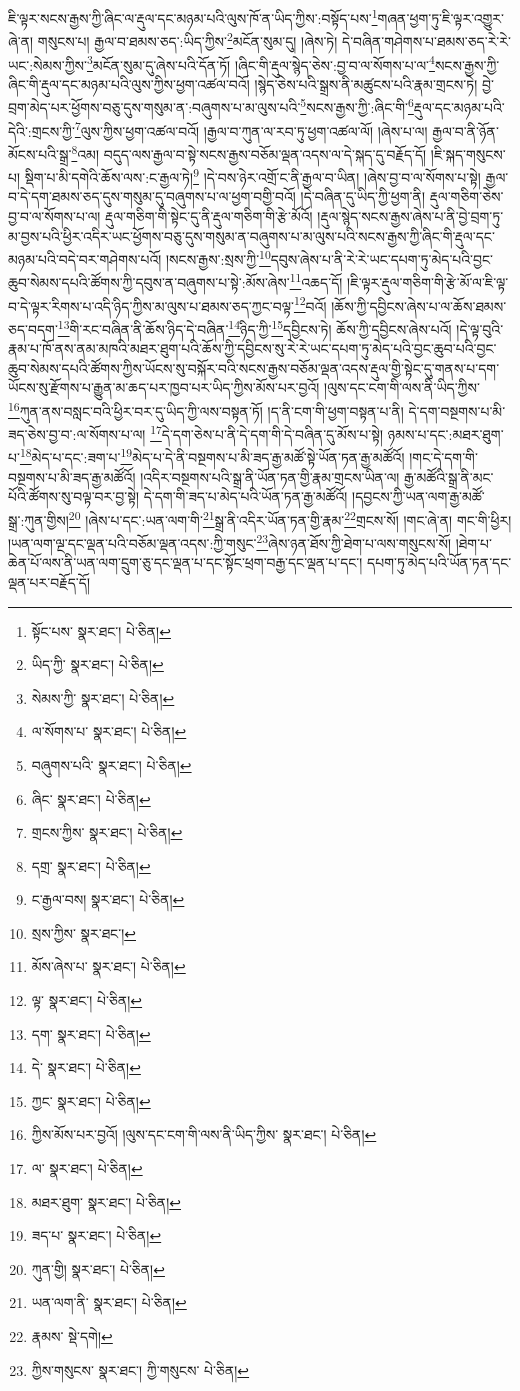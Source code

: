 ཇི་ལྟར་སངས་རྒྱས་ཀྱི་ཞིང་ལ་རྡུལ་དང་མཉམ་པའི་ལུས་ཁོ་ན་ཡིད་ཀྱིས་:བསྟོད་པས་\footnote{སྟོང་པས་  སྣར་ཐང་།  པེ་ཅིན། }གཞན་ཕྱག་ཏུ་ཇི་ལྟར་འགྱུར་ཞེ་ན། གསུངས་པ། རྒྱལ་བ་ཐམས་ཅད་:ཡིད་ཀྱིས་\footnote{ཡིད་ཀྱི་  སྣར་ཐང་།  པེ་ཅིན། }མངོན་སུམ་དུ། །ཞེས་ཏེ། དེ་བཞིན་གཤེགས་པ་ཐམས་ཅད་རེ་རེ་ཡང་:སེམས་ཀྱིས་\footnote{སེམས་ཀྱི་  སྣར་ཐང་།  པེ་ཅིན། }མངོན་སུམ་དུ་ཞེས་པའི་དོན་ཏོ། །ཞིང་གི་རྡུལ་སྙེད་ཅེས་:བྱ་བ་ལ་སོགས་པ་ལ་\footnote{ལ་སོགས་པ་  སྣར་ཐང་།  པེ་ཅིན། }སངས་རྒྱས་ཀྱི་ཞིང་གི་རྡུལ་དང་མཉམ་པའི་ལུས་ཀྱིས་ཕྱག་འཚལ་བའོ། །སྙེད་ཅེས་པའི་སྒྲས་ནི་མཚུངས་པའི་རྣམ་གྲངས་ཏེ། བྱེ་བྲག་མེད་པར་ཕྱོགས་བཅུ་དུས་གསུམ་ན་:བཞུགས་པ་མ་ལུས་པའི་\footnote{བཞུགས་པའི་  སྣར་ཐང་།  པེ་ཅིན། }སངས་རྒྱས་ཀྱི་:ཞིང་གི་\footnote{ཞིང་  སྣར་ཐང་།  པེ་ཅིན། }རྡུལ་དང་མཉམ་པའི་དེའི་:གྲངས་ཀྱི་\footnote{གྲངས་ཀྱིས་  སྣར་ཐང་།  པེ་ཅིན། }ལུས་ཀྱིས་ཕྱག་འཚལ་བའོ། །རྒྱལ་བ་ཀུན་ལ་རབ་ཏུ་ཕྱག་འཚལ་ལོ། །ཞེས་པ་ལ། རྒྱལ་བ་ནི་ཉོན་མོངས་པའི་སྒྲ་\footnote{དགྲ་  སྣར་ཐང་།  པེ་ཅིན། }འམ། བདུད་ལས་རྒྱལ་བ་སྟེ་སངས་རྒྱས་བཅོམ་ལྡན་འདས་ལ་དེ་སྐད་དུ་བརྗོད་དོ། །ཇི་སྐད་གསུངས་པ། སྡིག་པ་མི་དགེའི་ཆོས་ལས་:ང་རྒྱལ་ཏེ།\footnote{ང་རྒྱལ་བས།  སྣར་ཐང་།  པེ་ཅིན། } །དེ་བས་ཉེར་འགྲོ་ང་ནི་རྒྱལ་བ་ཡིན། །ཞེས་བྱ་བ་ལ་སོགས་པ་སྟེ། རྒྱལ་བ་དེ་དག་ཐམས་ཅད་དུས་གསུམ་དུ་བཞུགས་པ་ལ་ཕྱག་བགྱི་བའོ། །དེ་བཞིན་དུ་ཡིད་ཀྱི་ཕྱག་ནི། རྡུལ་གཅིག་ཅེས་བྱ་བ་ལ་སོགས་པ་ལ། རྡུལ་གཅིག་གི་སྟེང་དུ་ནི་རྡུལ་གཅིག་གི་རྩེ་མོའོ། །རྡུལ་སྙེད་སངས་རྒྱས་ཞེས་པ་ནི་བྱེ་བྲག་ཏུ་མ་བྱས་པའི་ཕྱིར་འདིར་ཡང་ཕྱོགས་བཅུ་དུས་གསུམ་ན་བཞུགས་པ་མ་ལུས་པའི་སངས་རྒྱས་ཀྱི་ཞིང་གི་རྡུལ་དང་མཉམ་པའི་བདེ་བར་གཤེགས་པའོ། །སངས་རྒྱས་:སྲས་ཀྱི་\footnote{སྲས་ཀྱིས་  སྣར་ཐང་། }དབུས་ཞེས་པ་ནི་རེ་རེ་ཡང་དཔག་ཏུ་མེད་པའི་བྱང་ཆུབ་སེམས་དཔའི་ཚོགས་ཀྱི་དབུས་ན་བཞུགས་པ་སྟེ་:མོས་ཞེས་\footnote{མོས་ཞེས་པ་  སྣར་ཐང་།  པེ་ཅིན། }འཆད་དོ། །ཇི་ལྟར་རྡུལ་གཅིག་གི་རྩེ་མོ་ལ་ཇི་ལྟ་བ་དེ་ལྟར་རིགས་པ་འདི་ཉིད་ཀྱིས་མ་ལུས་པ་ཐམས་ཅད་ཀྱང་བལྟ་\footnote{ལྟ་  སྣར་ཐང་།  པེ་ཅིན། }བའོ། །ཆོས་ཀྱི་དབྱིངས་ཞེས་པ་ལ་ཆོས་ཐམས་ཅད་བདག་\footnote{དག་  སྣར་ཐང་།  པེ་ཅིན། }གི་རང་བཞིན་ནི་ཆོས་ཉིད་དེ་བཞིན་\footnote{དེ་  སྣར་ཐང་།  པེ་ཅིན། }ཉིད་ཀྱི་\footnote{ཀྱང་  སྣར་ཐང་།  པེ་ཅིན། }དབྱིངས་ཏེ། ཆོས་ཀྱི་དབྱིངས་ཞེས་པའོ། །དེ་ལྟ་བུའི་རྣམ་པ་ཁོ་ནས་ནམ་མཁའི་མཐར་ཐུག་པའི་ཆོས་ཀྱི་དབྱིངས་སུ་རེ་རེ་ཡང་དཔག་ཏུ་མེད་པའི་བྱང་ཆུབ་པའི་བྱང་ཆུབ་སེམས་དཔའི་ཚོགས་ཀྱིས་ཡོངས་སུ་བསྐོར་བའི་སངས་རྒྱས་བཅོམ་ལྡན་འདས་རྡུལ་གྱི་སྟེང་དུ་གནས་པ་དག་ཡོངས་སུ་རྫོགས་པ་རྒྱུན་མ་ཆད་པར་ཁྱབ་པར་ཡིད་ཀྱིས་མོས་པར་བྱའོ། །ལུས་དང་ངག་གི་ལས་ནི་ཡིད་ཀྱིས་\footnote{ཀྱིས་མོས་པར་བྱའོ། །ལུས་དང་ངག་གི་ལས་ནི་ཡིད་ཀྱིས་  སྣར་ཐང་།  པེ་ཅིན། }ཀུན་ནས་བསླང་བའི་ཕྱིར་བར་དུ་ཡིད་ཀྱི་ལས་བསྟན་ཏོ། །ད་ནི་ངག་གི་ཕྱག་བསྟན་པ་ནི། དེ་དག་བསྔགས་པ་མི་ཟད་ཅེས་བྱ་བ་:ལ་སོགས་པ་ལ། \footnote{ལ་  སྣར་ཐང་།  པེ་ཅིན། }དེ་དག་ཅེས་པ་ནི་དེ་དག་གི་དེ་བཞིན་དུ་མོས་པ་སྟེ། ཉམས་པ་དང་:མཐར་ཐུག་པ་\footnote{མཐར་ཐུག་  སྣར་ཐང་།  པེ་ཅིན། }མེད་པ་དང་:ཟག་པ་\footnote{ཟད་པ་  སྣར་ཐང་།  པེ་ཅིན། }མེད་པ་དེ་ནི་བསྔགས་པ་མི་ཟད་རྒྱ་མཚོ་སྟེ་ཡོན་ཏན་རྒྱ་མཚོའོ། །གང་དེ་དག་གི་བསྔགས་པ་མི་ཟད་རྒྱ་མཚོའོ། །འདིར་བསྔགས་པའི་སྒྲ་ནི་ཡོན་ཏན་གྱི་རྣམ་གྲངས་ཡིན་ལ། རྒྱ་མཚོའི་སྒྲ་ནི་མང་པོའི་ཚོགས་སུ་བལྟ་བར་བྱ་སྟེ། དེ་དག་གི་ཟད་པ་མེད་པའི་ཡོན་ཏན་རྒྱ་མཚོའོ། །དབྱངས་ཀྱི་ཡན་ལག་རྒྱ་མཚོ་སྒྲ་:ཀུན་གྱིས།\footnote{ཀུན་གྱི།  སྣར་ཐང་།  པེ་ཅིན། } །ཞེས་པ་དང་:ཡན་ལག་གི་\footnote{ཡན་ལག་ནི་  སྣར་ཐང་།  པེ་ཅིན། }སྒྲ་ནི་འདིར་ཡོན་ཏན་གྱི་རྣམ་\footnote{རྣམས་  སྡེ་དགེ། }གྲངས་སོ། །གང་ཞེ་ན། གང་གི་ཕྱིར། །ཡན་ལག་ལྔ་དང་ལྡན་པའི་བཅོམ་ལྡན་འདས་:ཀྱི་གསུང་\footnote{ཀྱིས་གསུངས་  སྣར་ཐང་། ཀྱི་གསུངས་  པེ་ཅིན། }ཞེས་ཉན་ཐོས་ཀྱི་ཐེག་པ་ལས་གསུངས་སོ། །ཐེག་པ་ཆེན་པོ་ལས་ནི་ཡན་ལག་དྲུག་ཅུ་དང་ལྡན་པ་དང་སྟོང་ཕྲག་བརྒྱ་དང་ལྡན་པ་དང་། དཔག་ཏུ་མེད་པའི་ཡོན་ཏན་དང་ལྡན་པར་བརྗོད་དོ། 